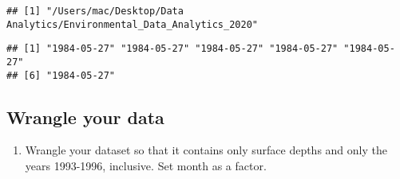 \documentclass[]{article}
\newenvironment{Shaded}{\begin{snugshade}}{\end{snugshade}}
\newcommand{\CommentTok}[1]{\textcolor[rgb]{0.56,0.35,0.01}{\textit{#1}}}
\newcommand{\DataTypeTok}[1]{\textcolor[rgb]{0.13,0.29,0.53}{#1}}
\newcommand{\KeywordTok}[1]{\textcolor[rgb]{0.13,0.29,0.53}{\textbf{#1}}}
\newcommand{\NormalTok}[1]{#1}
\newcommand{\OperatorTok}[1]{\textcolor[rgb]{0.81,0.36,0.00}{\textbf{#1}}}
\newcommand{\StringTok}[1]{\textcolor[rgb]{0.31,0.60,0.02}{#1}}
\providecommand{\tightlist}{%
  \setlength{\itemsep}{0pt}\setlength{\parskip}{0pt}}
\begin{document}
\begin{Shaded}
\end{Shaded}

\begin{verbatim}
## [1] "/Users/mac/Desktop/Data Analytics/Environmental_Data_Analytics_2020"
\end{verbatim}

\begin{Shaded}
\end{Shaded}

\begin{verbatim}
## [1] "1984-05-27" "1984-05-27" "1984-05-27" "1984-05-27" "1984-05-27"
## [6] "1984-05-27"
\end{verbatim}

\hypertarget{wrangle-your-data}{%
\subsection{Wrangle your data}\label{wrangle-your-data}}

\begin{enumerate}
\def\labelenumi{\arabic{enumi}.}
\setcounter{enumi}{2}
\tightlist
\item
  Wrangle your dataset so that it contains only surface depths and only
  the years 1993-1996, inclusive. Set month as a factor.
\end{enumerate}
\end{document}
